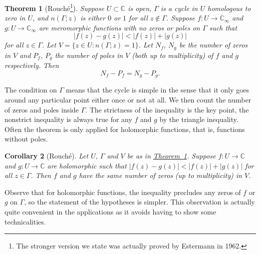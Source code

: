 \documentclass[12pt,openany]{book}
\newcommand{\sabs}[1]{\lvert {#1} \rvert}
\newcommand{\C}{{\mathbb{C}}}
\theoremstyle{plain}
\newtheorem{thm}{Theorem}[section]
\newtheorem{cor}[thm]{Corollary}
\theoremstyle{remark}
\theoremstyle{definition}
\theoremstyle{exercise}
\theoremstyle{example}
\newcommand{\thmref}[1]{\hyperref[#1]{Theorem~\ref*{#1}}}
\begin{document}
\begin{thm}[Rouch\'e\footnote{%
The stronger version we state was actually proved by Estermann in 1962.}]\label{thm:rouche}
\pagebreak[2]
Suppose $U \subset \C$ is open, $\Gamma$ is a cycle
in $U$ homologous to zero in $U$,
and $n(\Gamma;z)$ is either $0$ or $1$ for all $z \notin \Gamma$.
Suppose $f \colon U \to \C_\infty$ and $g \colon U \to \C_\infty$
are meromorphic functions with no zeros or poles on
$\Gamma$ such that
\begin{equation*}
\sabs{f(z)-g(z)} < \sabs{f(z)}+\sabs{g(z)}
\end{equation*}
for all $z \in \Gamma$.
Let $V = \bigl\{ z \in U : n(\Gamma;z) = 1 \bigr\}$.
Let $N_f$, $N_g$ be the number of zeros in $V$
and $P_f$, $P_g$ the number of poles in $V$ (both up to multiplicity)
of $f$ and $g$ respectively.
Then
\begin{equation*}
N_f - P_f = 
N_g - P_g.
\end{equation*}
\end{thm}

The condition on $\Gamma$ means that the
cycle is simple in the sense
that it only goes around any particular point either once or not at all.
We then count the number of zeros and poles inside $\Gamma$.
The strictness of the inequality is the key point,
the nonstrict inequality is always true for any $f$ and $g$ by the triangle
inequality.
Often the theorem is only applied for holomorphic functions, that is,
functions without poles.

\begin{cor}[Rouch\'e]\label{thm:rouche2}
Let $U$, $\Gamma$ and $V$ be as in \thmref{thm:rouche}.
Suppose $f \colon U \to \C$ and $g \colon U \to \C$
are holomorphic such that
$\sabs{f(z)-g(z)} < \sabs{f(z)}+\sabs{g(z)}$
for all $z \in \Gamma$.  Then $f$ and $g$ have the same number of zeros (up
to multiplicity) in $V$.
\end{cor}

Observe that for holomorphic functions,
the inequality precludes any zeros of $f$ or
$g$ on $\Gamma$, so the statement of the hypotheses is simpler.
This observation is actually quite convenient in the
applications as it avoids having to show some technicalities.
\end{document}
